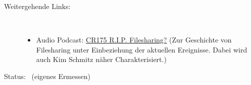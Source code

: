 \documentclass[12pt,a4paper,ngerman,numbers=noenddot,toc=listof]{scrartcl}	%
\begin{document}
\title{\TITEL}
\author{\AUTHOR}
\date{\ABGABEDATUM}
\maketitle



\setcounter{sectionsV}{\value{section}}		%
\appendix	%

\nocite{*}\newpage
\printbibliography[heading=quell]

\begin{description}
	\item[Weitergehende Links:]~
	\begin{itemize}
		\item Audio Podcast: \href{http://chaosradio.ccc.de/cr175.html}{CR175 R.I.P. Filesharing?}
			(Zur Geschichte von Filesharing unter Einbeziehung der aktuellen Ereignisse.
			Dabei wird auch Kim Schmitz näher Charakterisiert.)
	\end{itemize}
\end{description}

\vfill
\printURLlong
\printlicense
\printendsignature
  \newpage\Statistiken
  Status:~ (eigenes Ermessen)
  \begin{landscape}
	\pagestyle{empty}
   \begin{sourcefiletable}{1}
   \end{sourcefiletable}
	\pagestyle{empty}
	\printVersionNotes
  \end{landscape}
\end{document}
